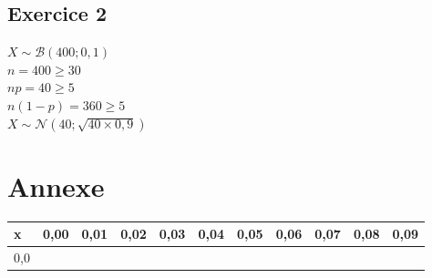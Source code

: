 \documentclass[12pt]{report}
\begin{document}
\section{Exercice 2}

$X \sim \mathcal{B}(400;0,1)$\\
$n = 400 \geq 30$\\
$np = 40 \geq 5$\\
$n(1-p) = 360 \geq 5$\\
$X \sim \mathcal{N}(40;\sqrt{40\times 0,9})$ 

\chapter{Annexe}

\begin{tabular}{l|c|c|c|c|c|c|c|c|c|c}
    \hline
    x & 0,00 & 0,01 & 0,02 & 0,03 & 0,04 & 0,05 & 0,06 & 0,07 & 0,08 & 0,09\\ 
    \hline 
    0,0
\end{tabular}
\end{document}
